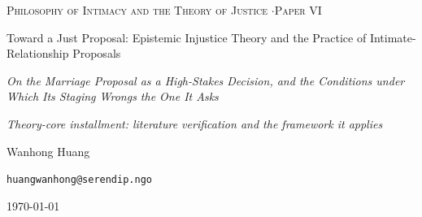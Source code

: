 \documentclass[11pt,a4paper]{article}
\begin{document}
\thispagestyle{empty}
\null\vfill
\begin{center}
{\footnotesize\color{rosedeep}\scshape Philosophy of Intimacy and the Theory of Justice \quad$\cdot$\quad Paper VI\par}
\vspace{0.9em}
\coverrule\par
\vspace{1.6em}
{\color{warnred}\Large Toward a Just Proposal: Epistemic Injustice Theory and the Practice of Intimate-Relationship Proposals\par}
\vspace{1.0em}
{\color{warnred}\large\itshape On the Marriage Proposal as a High-Stakes Decision, and the Conditions under Which Its Staging Wrongs the One It Asks\par}
\vspace{2.4em}
{\footnotesize\color{ink}\itshape Theory-core installment: literature verification and the framework it applies\par}
\vspace{2.0em}
\coverrule[0.25]\par
\vspace{1.4em}
{\large Wanhong Huang\par}
\vspace{0.5em}
{\footnotesize \texttt{huangwanhong@serendip.ngo}\par}
\vspace{1.2em}
{\today\par}
\end{center}
\vfill\null
\coverfootnote
\clearpage
\end{document}

